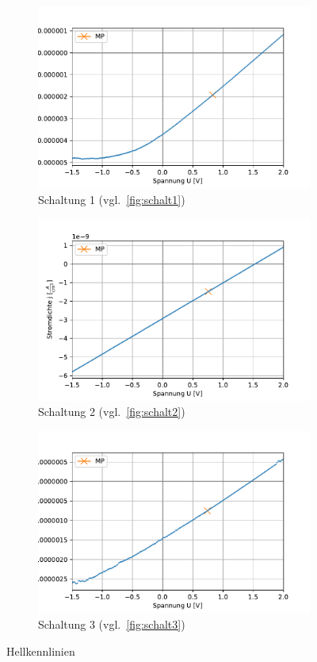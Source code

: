 \documentclass[slug=SZ, room=Hermann-Krone-Bau\,\ Labor\ 1.25, supervisor=Martin\ Kroll]{../../Lab_Report_LaTeX/lab_report}
\begin{document}
\begin{figure}[H]\centering
\begin{subfigure}[b]{1\textwidth}\centering
        \includegraphics[width=.6\columnwidth]{figs/python/C/3x3_schaltung_2.pdf}
        \caption{Schaltung 1 (vgl.~\ref{fig:schalt1})}
        \label{diag:hellschalt1}
\end{subfigure}
\begin{subfigure}[b]{1\textwidth}\centering
        \includegraphics[width=.6\columnwidth]{figs/python/C/3x3_schaltung_3.pdf}
        \caption{Schaltung 2 (vgl.~\ref{fig:schalt2})}
        \label{diag:hellschalt2}
\end{subfigure}
\begin{subfigure}[b]{1\textwidth}\centering
        \includegraphics[width=.6\columnwidth]{figs/python/C/3x3_schaltung_4.pdf}
        \caption{Schaltung 3 (vgl.~\ref{fig:schalt3})}
        \label{diag:hellschalt3}
\end{subfigure}
        \caption{Hellkennlinien}
        \label{fig:hellkenn}
\end{figure}
\end{document}
